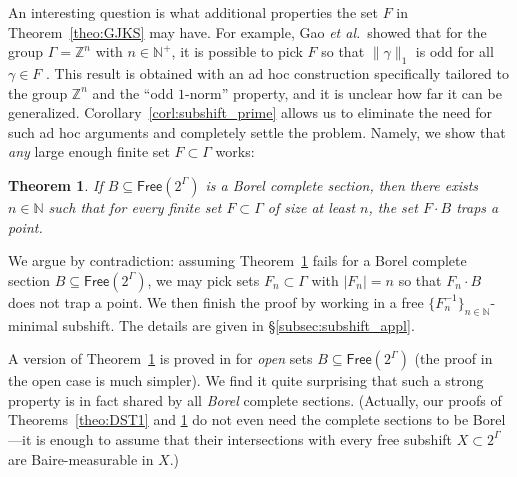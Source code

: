 \documentclass[11pt,reqno,psamsfonts]{amsart}
\theoremstyle{bfnote}
\newtheorem{theo}{Theorem}[section]
\theoremstyle{definition}
\theoremstyle{remark}
\newcommand{\0}{\varnothing}
\newcommand{\set}[1]{\{#1\}}
\newcommand{\G}{\Gamma}
\newcommand{\Free}{\mathsf{Free}}
\newcommand{\N}{\mathbb{N}}
\newcommand{\Z}{\mathbb{Z}}
\numberwithin{equation}{section}
\begin{document}
    An interesting question is what additional properties the set $F$ in Theorem~\ref{theo:GJKS} may have. %
    For example, Gao \emph{et al.}~showed that for the group $\G = \Z^n$ with $n \in \N^+$, it is possible to pick $F$ so that $\|\gamma\|_1$ is odd for all $\gamma \in F$ \cite[Thm.~1.3]{GJKS_Borel}. This result is obtained with an ad hoc construction specifically tailored to the group $\Z^n$ and the ``odd $1$-norm'' property, %
    and it is unclear how far it can be generalized. 
    Corollary~\ref{corl:subshift_prime} %
    allows us to eliminate the need for such ad hoc arguments and
    completely settle the problem. %
    Namely, we show that \emph{any} large enough finite set $F \subset \G$ works: %

    \begin{tcolorbox}
    \begin{theo}\label{theo:DST}
        If $B \subseteq \Free(2^\G)$ is a Borel complete section, then there exists $n \in \N$ such that for every finite set $F \subset \G$ of size at least $n$, the set $F \cdot B$ traps a point.
    \end{theo}
    \end{tcolorbox}

    We argue by contradiction: assuming Theorem~\ref{theo:DST} fails for a Borel complete section $B \subseteq \Free(2^\G)$, we may pick sets $F_n \subset \G$ with $|F_n| = n$ so that $F_n \cdot B$ does not trap a point. We then finish the proof by working in a free $\set{F_n^{-1}}_{n \in \N}$-minimal subshift. The details are given in \S\ref{subsec:subshift_appl}.

    A version of Theorem~\ref{theo:DST} is proved in \cite[Thm.~1.2]{LLLDyn3} for \emph{open} sets $B \subseteq \Free(2^\G)$ (the proof in the open case is much simpler). We find it quite surprising that such a strong property is in fact shared by all \emph{Borel} complete sections. (Actually, our proofs of Theorems~\ref{theo:DST1} and \ref{theo:DST} do not even need the complete sections to be Borel---it is enough to assume that their intersections with every free subshift $X \subset 2^\G$ are Baire-measurable in $X$.) 

    


    
    

\end{document}
